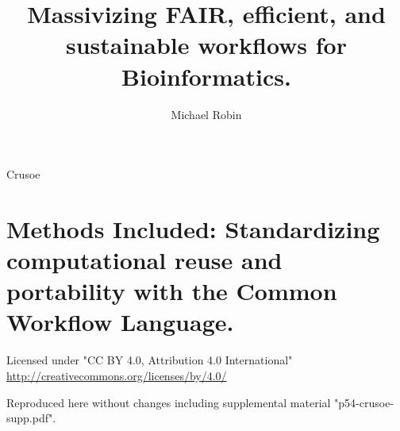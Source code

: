 \documentclass{dissertation}
\begin{document}
\title{Massivizing {FAIR,} {efficient,} and sustainable workflows for Bioinformatics.}
\author{Michael Robin}{Crusoe}

\frontmatter




\tableofcontents




\mainmatter

\thumbtrue

\nobibliography*



\chapter{Methods Included: Standardizing computational reuse and portability with the Common Workflow Language.}
\label{methods-included}


Licensed under "CC BY 4.0, Attribution 4.0 International" \url{http://creativecommons.org/licenses/by/4.0/}

Reproduced here without changes including supplemental material "p54-crusoe-supp.pdf".



\end{document}
